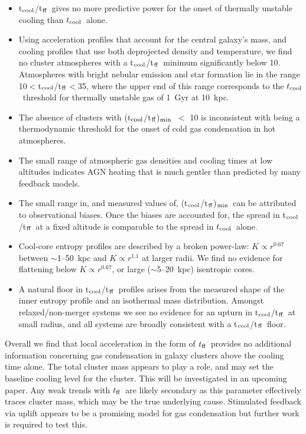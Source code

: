 \documentclass[twocolumn]{aastex6}
\newcommand{\tctff}{{t$_{\rm cool}$/t$_{\rm ff}$}}
\newcommand{\tctffmin}{(\tctff)$_{\rm min}$}
\newcommand{\tc}{$t_{\rm cool}$}
\newcommand{\tff}{$t_{\rm ff}$}
\begin{document}
\begin{itemize}
    \item  \tctff\ gives no more predictive power for the onset of thermally unstable cooling than \tc\ alone.
    \item  Using acceleration profiles that account for the central galaxy's mass, and cooling profiles that use both deprojected density and temperature, we find no cluster atmospheres with a \tctff\ minimum significantly below 10.  Atmospheres with bright nebular emission and star formation lie in the range 10$<$\tctff$<$35, where the upper end of this range corresponds to the \tc\ threshold for thermally unstable gas of 1~Gyr at 10~kpc.
    \item  The absence of clusters with \tctffmin\ $<$ 10 is inconsistent with being a thermodynamic threshold for the onset of cold gas condensation in hot atmospheres.
    \item  The small range of atmospheric gas densities and cooling times at low altitudes indicates AGN heating that is much gentler than predicted by many feedback models.
    \item  The small range in, and measured values of, \tctffmin\ can be attributed to observational biases.  Once the biases are accounted for, the spread in \tctff\ at a fixed altitude is comparable to the spread in \tc\ alone.
    \item  Cool-core entropy profiles are described by a broken power-law: $K \propto r^{0.67}$ between $\sim$1--50~kpc and $K \propto r^{1.1}$ at larger radii.  We find no evidence for flattening below $K \propto r^{0.67}$, or large ($\sim$5--20~kpc) isentropic cores.
    \item  A natural floor in \tctff\ profiles arises from the measured shape of the inner entropy profile and an isothermal mass distribution.  Amongst relaxed/non-merger systems we see no evidence for an upturn in \tctff\ at small radius, and all systems are broadly consistent with a \tctff\ floor.
\end{itemize}

Overall we find that local acceleration in the form of \tff\ provides no additional information concerning gas condensation in galaxy clusters above the cooling time alone. The total cluster mass appears to play a role, and may set the baseline cooling level for the cluster.  This will be investigated in an upcoming paper.  Any weak trends with \tff\ are likely secondary as this parameter effectively traces cluster mass, which may be the true underlying cause. Stimulated feedback via uplift appears to be a promising model for gas condensation but further work is required to test this. 
\end{document}
